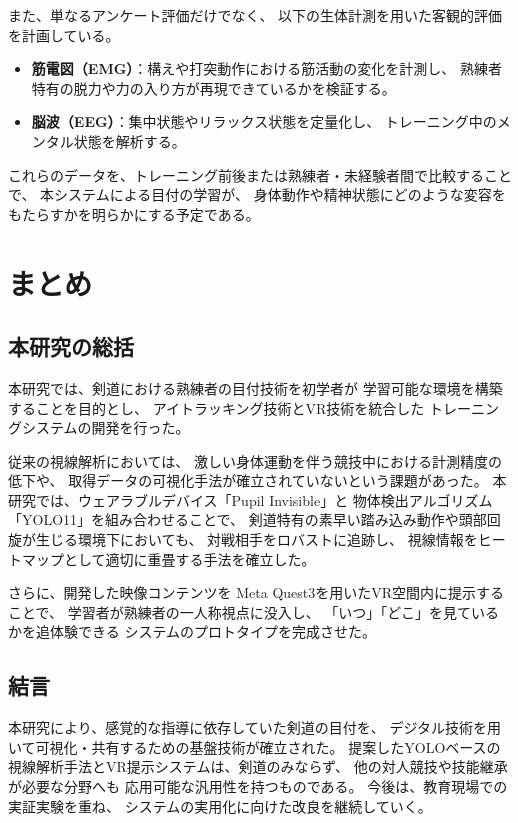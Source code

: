 \documentclass[dvipdfmx]{ujreport}
\begin{document}
    また、単なるアンケート評価だけでなく、
    以下の生体計測を用いた客観的評価を計画している。
    \begin{itemize}
        \item \textbf{筋電図（EMG）}：構えや打突動作における筋活動の変化を計測し、
        熟練者特有の脱力や力の入り方が再現できているかを検証する。
        \item \textbf{脳波（EEG）}：集中状態やリラックス状態を定量化し、
        トレーニング中のメンタル状態を解析する。
    \end{itemize}
    これらのデータを、トレーニング前後または熟練者・未経験者間で比較することで、
    本システムによる目付の学習が、
    身体動作や精神状態にどのような変容をもたらすかを明らかにする予定である。

\chapter{まとめ}

\section{本研究の総括}
    本研究では、剣道における熟練者の目付技術を初学者が
    学習可能な環境を構築することを目的とし、
    アイトラッキング技術とVR技術を統合した
    トレーニングシステムの開発を行った。

    従来の視線解析においては、
    激しい身体運動を伴う競技中における計測精度の低下や、
    取得データの可視化手法が確立されていないという課題があった。
    本研究では、ウェアラブルデバイス「Pupil Invisible」と
    物体検出アルゴリズム「YOLO11」を組み合わせることで、
    剣道特有の素早い踏み込み動作や頭部回旋が生じる環境下においても、
    対戦相手をロバストに追跡し、
    視線情報をヒートマップとして適切に重畳する手法を確立した。

    さらに、開発した映像コンテンツを
    Meta Quest3を用いたVR空間内に提示することで、
    学習者が熟練者の一人称視点に没入し、
    「いつ」「どこ」を見ているかを追体験できる
    システムのプロトタイプを完成させた。


\section{結言}
    本研究により、感覚的な指導に依存していた剣道の目付を、
    デジタル技術を用いて可視化・共有するための基盤技術が確立された。
    提案したYOLOベースの視線解析手法とVR提示システムは、剣道のみならず、
    他の対人競技や技能継承が必要な分野へも
    応用可能な汎用性を持つものである。
    今後は、教育現場での実証実験を重ね、
    システムの実用化に向けた改良を継続していく。
\end{document}
